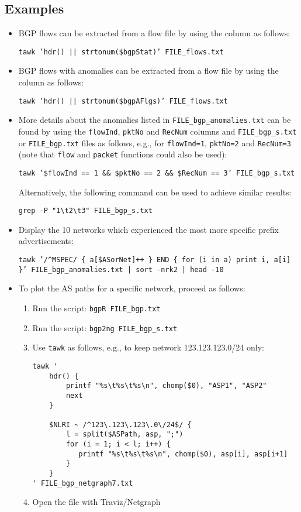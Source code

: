 \documentclass[documentation]{subfiles}
\begin{document}
\subsection{Examples}
\begin{itemize}
    \item BGP flows can be extracted from a flow file by using the {\tt{}} column as follows:
\begin{center}
    {\tt tawk 'hdr() || strtonum(\$bgpStat)' FILE\_flows.txt}
\end{center}
    \item BGP flows with anomalies can be extracted from a flow file by using the {\tt{}} column as follows:
\begin{center}
    {\tt tawk 'hdr() || strtonum(\$bgpAFlgs)' FILE\_flows.txt}
\end{center}
    \item More details about the anomalies listed in {\tt FILE\_bgp\_anomalies.txt} can be found by using the {\tt flowInd}, {\tt pktNo} and {\tt RecNum} columns and {\tt FILE\_bgp\_s.txt} or {\tt FILE\_bgp.txt} files as follows, e.g., for {\tt flowInd=1}, {\tt pktNo=2} and {\tt RecNum=3} (note that  {\tt flow} and {\tt packet} functions could also be used):
\begin{center}
    {\tt tawk '\$flowInd == 1 \&\& \$pktNo == 2 \&\& \$RecNum == 3' FILE\_bgp\_s.txt}
\end{center}
    Alternatively, the following command can be used to achieve similar results:
\begin{center}
    {\tt grep -P "1\textbackslash{}t2\textbackslash{}t3" FILE\_bgp\_s.txt}
\end{center}
    \item Display the 10 networks which experienced the most more specific prefix advertisements:
\begin{center}
    {\tt tawk '/\textasciicircum{}MSPEC/ \{ a[\$ASorNet]++ \} END \{ for (i in a) print i, a[i] \}' FILE\_bgp\_anomalies.txt | sort -nrk2 | head -10}
\end{center}
    \item To plot the AS paths for a specific network, proceed as follows:
\begin{enumerate}
    \item Run the {\tt{}} script: {\tt bgpR FILE\_bgp.txt}
    \item Run the {\tt{}} script: {\tt bgp2ng FILE\_bgp\_s.txt}
    \item Use {\tt tawk} as follows, e.g., to keep network 123.123.123.0/24 only:
\begin{verbatim}
tawk '
    hdr() {
        printf "%s\t%s\t%s\n", chomp($0), "ASP1", "ASP2"
        next
    }

    $NLRI ~ /^123\.123\.123\.0\/24$/ {
        l = split($ASPath, asp, ";")
        for (i = 1; i < l; i++) {
           printf "%s\t%s\t%s\n", chomp($0), asp[i], asp[i+1]
        }
    }
' FILE_bgp_netgraph7.txt
\end{verbatim}
    \item Open the file with Traviz/Netgraph
\end{enumerate}
\end{itemize}
\end{document}
